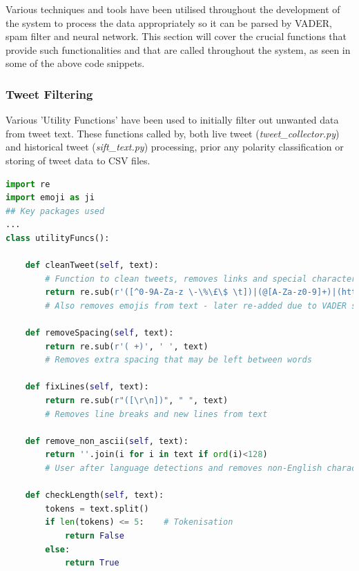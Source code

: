 \documentclass[oneside, 12pt]{article}
\begin{document}
			Various techniques and tools have been utilised throughout the development of the system to process the data appropriately so it can be parsed by VADER, spam filter and neural network. This section will cover the crucial functions that provide such functionalities and that are called throughout the system, as seen in some of the above code snippets.
			
			\subsubsection{Tweet Filtering}
			
			Various 'Utility Functions' have been used to initially filter out unwanted data from tweet text. These functions called by, both live tweet (\textit{tweet\_collector.py}) and historical tweet (\textit{sift\_text.py}) processing, prior any polarity classification or storing of tweet data to CSV files.
				
				\begin{lstlisting}[language=python, caption=Basic data filtering and processing function - defined in 'tweet\_collector.py']
import re
import emoji as ji
## Key packages used
...
class utilityFuncs():
				
	def cleanTweet(self, text):
		# Function to clean tweets, removes links and special characters
		return re.sub(r'([^0-9A-Za-z \-\%\£\$ \t])|(@[A-Za-z0-9]+)|(http\S+)', '', text), ' '.join(c for c in text if c in ji.UNICODE_EMOJI)
		# Also removes emojis from text - later re-added due to VADER supporting emoticons
				
	def removeSpacing(self, text):
		return re.sub(r'( +)', ' ', text)
		# Removes extra spacing that may be left between words
				
	def fixLines(self, text):
		return re.sub(r"([\r\n])", " ", text)
		# Removes line breaks and new lines from text
								
	def remove_non_ascii(self, text):
		return ''.join(i for i in text if ord(i)<128)
		# User after language detections and removes non-English characters from text
		
	def checkLength(self, text):
		tokens = text.split()
		if len(tokens) <= 5:	# Tokenisation
			return False
		else:
			return True
				\end{lstlisting}
				
\end{document}

